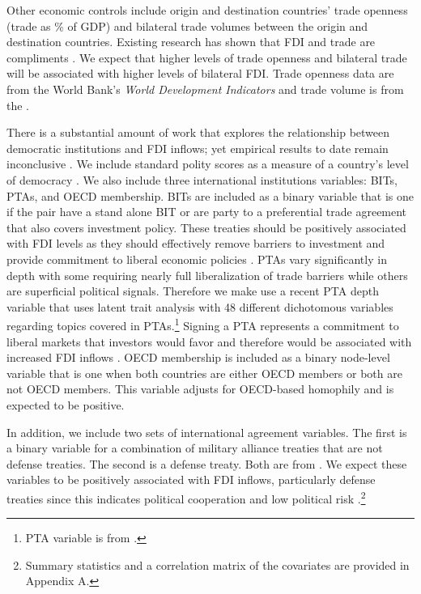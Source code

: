 \documentclass[reqno,onecolumn,letterpaper,12pt]{article}
\begin{document}
Other economic controls include origin and destination countries' trade openness (trade as \% of GDP) and bilateral trade volumes between the origin and destination countries. Existing research has shown that FDI and trade are compliments \citep{aizenman2006fdi,Markusen:1995}. We expect that higher levels of trade openness and bilateral trade will be associated with higher levels of bilateral FDI. Trade openness data are from the World Bank's \textit{World Development Indicators} and trade volume is from the \citet{OECD}.

There is a substantial amount of work that explores the relationship between democratic institutions and FDI inflows; yet empirical results to date remain inconclusive \citep[see,~e.g.,][]{Jensen:2003,Jakobsen_DeSoysa:2006,Li_et_al:2018,Wright_Zhu:2018,Arel-Bundock:2017b}. We include standard polity scores as a measure of a country's level of democracy \citep{Marshall_Jaggers:2010}. We also include three international institutions variables: BITs, PTAs, and OECD membership. BITs are included as a binary variable that is one if the pair have a stand alone BIT or are party to a preferential trade agreement that also covers investment policy. These treaties should be positively associated with FDI levels as they should effectively remove barriers to investment and provide commitment to liberal economic policies \citep[e.g.,][]{Buthe_Milner:2008,Allee_Peinhardt:2011,Medvedev:2012,Osnago_et_al:2017}. PTAs vary significantly in depth with some requiring nearly full liberalization of trade barriers while others are superficial political signals. Therefore we make use a recent PTA depth variable that uses latent trait analysis with 48 different dichotomous variables regarding topics covered in PTAs.\footnote{PTA variable is from \citet{dur2014design}.} Signing a PTA represents a commitment to liberal markets that investors would favor and therefore would be associated with increased FDI inflows \citep{Buthe_Milner:2008,buthe2014foreign}. OECD membership is included as a binary node-level variable that is one when both countries are either OECD members or both are not OECD members. This variable adjusts for OECD-based homophily and is expected to be positive.


In addition, we include two sets of international agreement variables. The first is a binary variable for a combination of military alliance treaties that are not defense treaties. The second is a defense treaty. Both are from \citet{Gibler09}. We expect these variables to be positively associated with FDI inflows, particularly defense treaties since this indicates political cooperation and low political risk \citep{Li_Vashchilko:2010}.\footnote{Summary statistics and a correlation matrix of the covariates are provided in Appendix A.}
\end{document}
